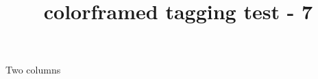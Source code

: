 \documentclass[twocolumn]{article}
\title{colorframed tagging test - 7}
\begin{document}
\kant[1]

\begin{titled-frame}{Two columns}
\kant[2-9]
\end{titled-frame}

\kant[10]
\end{document}
